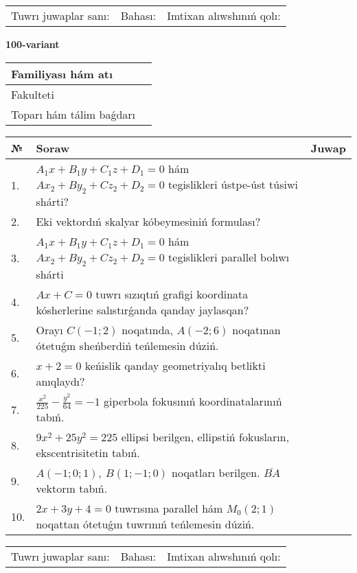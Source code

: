 \documentclass{article}
\begin{document}
\vspace{1cm}

\begin{tabular}{lll}
Tuwrı juwaplar sanı: \underline{\hspace{1.5cm}} & 
Bahası: \underline{\hspace{1.5cm}} & 
Imtixan alıwshınıń qolı: \underline{\hspace{2cm}} \\
\end{tabular}

\egroup

\newpage


\textbf{100-variant}\\

\bgroup
\def\arraystretch{1.6} %

\begin{tabular}{|m{5.7cm}|m{9.5cm}|}
\hline
Familiyası hám atı & \\
\hline
Fakulteti  & \\
\hline
Toparı hám tálim baǵdarı  & \\
\hline
\end{tabular}

\vspace{1cm}

\begin{tabular}{|m{0.7cm}|m{10cm}|m{4cm}|}
\hline
№ & Soraw & Juwap \\
\hline
1. & $A_1x+B_1y+C_1z+D_1=0$ hám $Ax_2+By_2+Cz_2+D_2=0$ tegislikleri ústpe-úst túsiwi shárti? &  \\
\hline
2. & Eki vektordıń skalyar kóbeymesiniń formulası? &  \\
\hline
3. & $A_1x+B_1y+C_1z+D_1=0$ hám $Ax_2+By_2+Cz_2+D_2=0$ tegislikleri parallel bolıwı shárti &  \\
\hline
4. & $Ax+C=0$ tuwrı sızıqtıń grafigi koordinata kósherlerine salıstırǵanda qanday jaylasqan? &  \\
\hline
5. & Orayı $C (-1;2)$ noqatında, $A (-2;6 )$ noqatınan ótetuǵın sheńberdiń teńlemesin dúziń. &  \\
\hline
6. & $x+2=0$ keńislik qanday geometriyalıq betlikti anıqlaydı? &  \\
\hline
7. & $\frac{x^{2}}{225}-\frac{y^{2}}{64}=-1$ giperbola fokusınıń koordinatalarınıń tabıń. &  \\
\hline
8. & $9x^{2}+25y^{2}=225$ ellipsi berilgen, ellipstiń fokusların, ekscentrisitetin tabıń. &  \\
\hline
9. & $A (-1;0;1),\ B (1;-1;0)$ noqatları berilgen. $\overline{BA}$ vektorın tabıń. &  \\
\hline
10. & $2x+3y+4=0$ tuwrısına parallel hám $M_{0} (2;1)$ noqattan ótetuǵın tuwrınıń teńlemesin dúziń. &  \\
\hline
\end{tabular}

\vspace{1cm}

\begin{tabular}{lll}
Tuwrı juwaplar sanı: \underline{\hspace{1.5cm}} & 
Bahası: \underline{\hspace{1.5cm}} & 
Imtixan alıwshınıń qolı: \underline{\hspace{2cm}} \\
\end{tabular}

\egroup

\newpage
\end{document}
